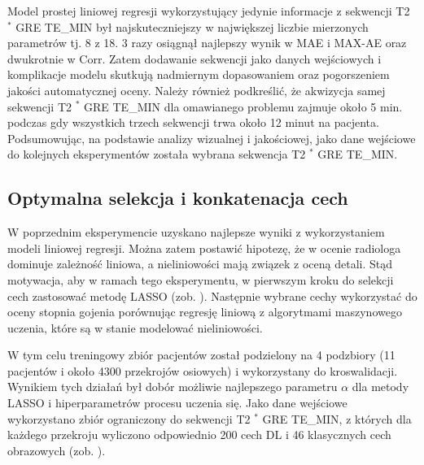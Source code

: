 Model prostej liniowej regresji wykorzystujący jedynie informacje z sekwencji T2 $^\ast$ GRE TE\_MIN był najskuteczniejszy w największej liczbie mierzonych parametrów tj. 8 z 18. 3 razy osiągnął najlepszy wynik w MAE i MAX-AE oraz dwukrotnie w Corr. Zatem dodawanie sekwencji jako danych wejściowych i komplikacje modelu skutkują nadmiernym dopasowaniem oraz pogorszeniem jakości automatycznej oceny. Należy również podkreślić, że akwizycja samej sekwencji T2 $^\ast$ GRE TE\_MIN dla omawianego problemu zajmuje około 5 min. podczas gdy wszystkich trzech sekwencji trwa około 12 minut na pacjenta. Podsumowując, na podstawie analizy wizualnej i jakościowej, jako dane wejściowe do kolejnych eksperymentów została wybrana sekwencja T2 $^\ast$ GRE TE\_MIN. 

\subsection{Optymalna selekcja i konkatenacja cech}

W poprzednim eksperymencie uzyskano najlepsze wyniki z wykorzystaniem modeli liniowej regresji. Można zatem postawić hipotezę, że w ocenie radiologa dominuje zależność liniowa, a nieliniowości mają związek z oceną detali. Stąd motywacja, aby w ramach tego eksperymentu, w pierwszym kroku do selekcji cech zastosować metodę LASSO (zob. ). Następnie wybrane cechy wykorzystać do oceny stopnia gojenia porównując regresję liniową z algorytmami maszynowego uczenia, które są w stanie modelować nieliniowości. 

W tym celu treningowy zbiór pacjentów został podzielony na 4 podzbiory (11 pacjentów i około 4300 przekrojów osiowych) i wykorzystany do kroswalidacji. Wynikiem tych działań był dobór możliwie najlepszego parametru $\alpha$ dla metody LASSO i hiperparametrów procesu uczenia się. Jako dane wejściowe wykorzystano zbiór ograniczony do sekwencji T2 $^\ast$ GRE TE\_MIN, z których dla każdego przekroju wyliczono odpowiednio 200 cech DL i 46 klasycznych cech obrazowych (zob. ).

